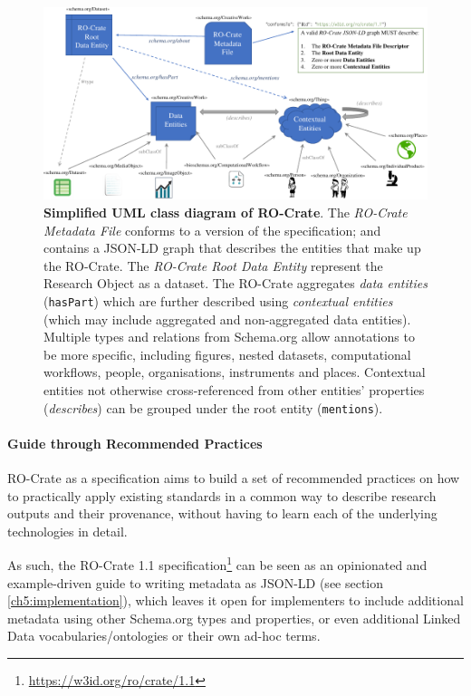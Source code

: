 \begin{figure}
\includegraphics[width=\textwidth]{figures/ch05/ro-crate-uml.pdf}
	\caption[Simplified UML class diagram of RO-Crate]{\textbf{Simplified UML class diagram of RO-Crate}. The 
\emph{RO-Crate Metadata File} conforms to a version of the specification;
and contains a JSON-LD graph \cite{w3-ldp} that describes the
entities that make up the RO-Crate. The \emph{RO-Crate Root Data
Entity} represent the Research Object as a dataset. The RO-Crate
aggregates \emph{data entities} (\texttt{hasPart}) which are further
described using \emph{contextual entities} (which may include
aggregated and non-aggregated data entities). Multiple types and
relations from Schema.org allow annotations to be more specific,
including figures, nested datasets, computational workflows, people,
organisations, instruments and places. Contextual entities not
otherwise cross-referenced from other entities' properties 
(\emph{describes}) can be grouped under the root entity (\texttt{mentions}).}
\label{ch5:fig:uml}
\end{figure}

\paragraph{Guide through Recommended
Practices}\label{ch5:recommendedpractices}

RO-Crate as a specification aims to build a set of recommended practices
on how to practically apply existing standards in a common way to
describe research outputs and their provenance, without having to learn
each of the underlying technologies in detail.

As such, the RO-Crate 1.1
specification\footnote{\url{https://w3id.org/ro/crate/1.1}} \cite{ch5-106}
can be seen as an opinionated and example-driven guide to writing
\cite{ch5-62} metadata as
JSON-LD \cite{w3-ldp} (see
section \vref{ch5:implementation}), which
leaves it open for implementers to include additional metadata using
other Schema.org types and properties, or even additional Linked Data
vocabularies/ontologies or their own ad-hoc terms.

